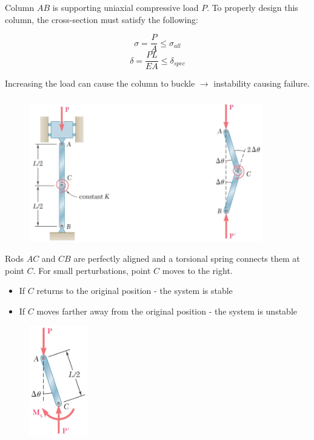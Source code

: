 \noindent Column $AB$ is supporting uniaxial compressive load $P$. To properly design this column, the cross-section must satisfy the following:

\[\sigma = \frac{P}{A} \le \sigma_{all}\]
\[\delta = \frac{PL}{EA} \le \delta_{spec}\]

\noindent Increasing the load can cause the column to buckle $\rightarrow$ instability causing failure.

\subsubsection{}

\begin{figure}[!h]
\centering
\includegraphics[angle=0, width=4in]{Buckling-Figures/TwoRods.png}
\vspace{-2mm}
\caption{\small {}}
\vspace{-3mm}
\label{Fig:TwoRods}
\end{figure}

\noindent Rods $AC$ and $CB$ are perfectly aligned and a torsional spring connects them at point $C$. For small perturbations, point $C$ moves to the right.
\begin{itemize}
    \item If $C$ returns to the original position - the system is stable
    \item If $C$ moves farther away from the original position - the system is unstable
\end{itemize}

\begin{figure}[!h]
\centering
\includegraphics[angle=0, width=1in]{Buckling-Figures/TopRodFBD.png}
\vspace{-2mm}
\caption{\small {}}
\vspace{-3mm}
\label{Fig:TopRodFBD}
\end{figure}


